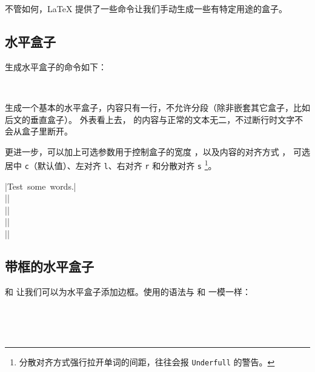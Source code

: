 不管如何，\LaTeX{} 提供了一些命令让我们手动生成一些有特定用途的盒子。

\subsection{水平盒子}\label{subsec:mbox}

生成水平盒子的命令如下：
\begin{command}
\marg*{\ldots} \\
\marg*{\ldots}
\end{command}

 生成一个基本的水平盒子，内容只有一行，不允许分段（除非嵌套其它盒子，比如后文的垂直盒子）。
外表看上去， 的内容与正常的文本无二，不过断行时文字不会从盒子里断开。

 更进一步，可以加上可选参数用于控制盒子的宽度 ，以及内容的对齐方式 ，
可选居中 \texttt{c}（默认值）、左对齐 \texttt{l}、右对齐 \texttt{r} 和分散对齐 \texttt{s}%
\footnote{分散对齐方式强行拉开单词的间距，往往会报 \texttt{Underfull}  的警告。}。

\begin{example}
|\mbox{Test some words.}|\\
||\\
||\\
||\\
||
\end{example}

\subsection{带框的水平盒子}\label{subsec:fbox}

 和  让我们可以为水平盒子添加边框。使用的语法与  和  一模一样：
\begin{command}
\marg*{\ldots} \\
\marg*{\ldots}
\end{command}
\begin{example}
\\
\end{example}

